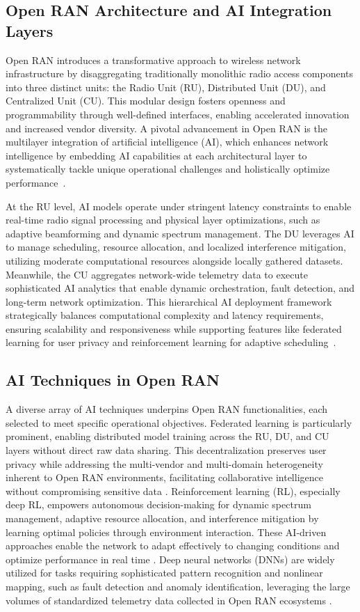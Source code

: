 \documentclass[sigconf]{acmart}
\begin{document}
\subsection{Open RAN Architecture and AI Integration Layers}

Open RAN introduces a transformative approach to wireless network infrastructure by disaggregating traditionally monolithic radio access components into three distinct units: the Radio Unit (RU), Distributed Unit (DU), and Centralized Unit (CU). This modular design fosters openness and programmability through well-defined interfaces, enabling accelerated innovation and increased vendor diversity. A pivotal advancement in Open RAN is the multilayer integration of artificial intelligence (AI), which enhances network intelligence by embedding AI capabilities at each architectural layer to systematically tackle unique operational challenges and holistically optimize performance~\cite{ref54}.

At the RU level, AI models operate under stringent latency constraints to enable real-time radio signal processing and physical layer optimizations, such as adaptive beamforming and dynamic spectrum management. The DU leverages AI to manage scheduling, resource allocation, and localized interference mitigation, utilizing moderate computational resources alongside locally gathered datasets. Meanwhile, the CU aggregates network-wide telemetry data to execute sophisticated AI analytics that enable dynamic orchestration, fault detection, and long-term network optimization. This hierarchical AI deployment framework strategically balances computational complexity and latency requirements, ensuring scalability and responsiveness while supporting features like federated learning for user privacy and reinforcement learning for adaptive scheduling~\cite{ref54}.

\subsection{AI Techniques in Open RAN}

A diverse array of AI techniques underpins Open RAN functionalities, each selected to meet specific operational objectives. Federated learning is particularly prominent, enabling distributed model training across the RU, DU, and CU layers without direct raw data sharing. This decentralization preserves user privacy while addressing the multi-vendor and multi-domain heterogeneity inherent to Open RAN environments, facilitating collaborative intelligence without compromising sensitive data \cite{ref54}. Reinforcement learning (RL), especially deep RL, empowers autonomous decision-making for dynamic spectrum management, adaptive resource allocation, and interference mitigation by learning optimal policies through environment interaction. These AI-driven approaches enable the network to adapt effectively to changing conditions and optimize performance in real time \cite{ref21,ref22}. Deep neural networks (DNNs) are widely utilized for tasks requiring sophisticated pattern recognition and nonlinear mapping, such as fault detection and anomaly identification, leveraging the large volumes of standardized telemetry data collected in Open RAN ecosystems \cite{ref23,ref24}.
\end{document}
